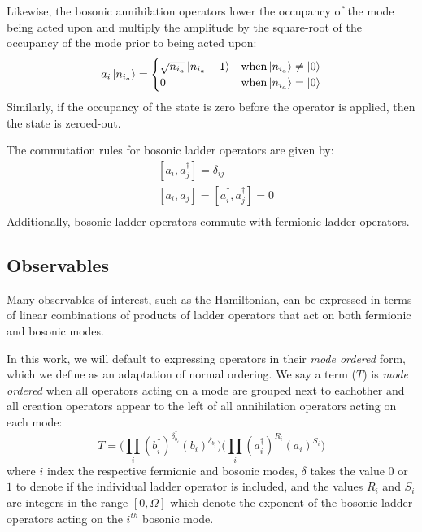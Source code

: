Likewise, the bosonic annihilation operators lower the occupancy of the mode being acted upon and multiply the amplitude by the square-root of the occupancy of the mode prior to being acted upon:
\begin{equation}
    \label{eq:bosonic-annihilation}
    a_i \ket{n_{i_a}} = 
    \begin{cases} 
        \sqrt{n_{i_a}} \ket{n_{i_a} - 1}  & {\rm when} \ket{n_{i_a}} \neq \ket{0} \\
        0 & {\rm when} \ket{n_{i_a}} = \ket{0}
    \end{cases}
\end{equation}
Similarly, if the occupancy of the state is zero before the operator is applied, then the state is zeroed-out.

The commutation rules for bosonic ladder operators are given by:
\begin{equation}
    \label{eq:bosonic-commutation}
    \begin{split}
        &[a_i, a_j^\dagger] = \delta_{ij}\\
        & [a_i, a_j] = [a_i^\dagger, a_j^\dagger] = 0 \\
    \end{split}
\end{equation}
Additionally, bosonic ladder operators commute with fermionic ladder operators.

\subsection{Observables}
\label{subsec:observables}

Many observables of interest, such as the Hamiltonian, can be expressed in terms of linear combinations of products of ladder operators that act on both fermionic and bosonic modes.

In this work, we will default to expressing operators in their \emph{mode ordered} form, which we define as an adaptation of normal ordering.
We say a term ($T$) is \textit{mode ordered} when all operators acting on a mode are grouped next to eachother and all creation operators appear to the left of all annihilation operators acting on each mode:
\begin{equation}
    T = \Big( \prod_i (b_i^\dagger)^{\delta_{b_i}^{\dagger}} (b_i)^{\delta_{b_i}} \Big) \Big( \prod_i (a_i^\dagger)^{R_i}(a_i)^{S_i} \Big) 
\end{equation}
where $i$ index the respective fermionic and bosonic modes, $\delta$ takes the value $0$ or $1$ to denote if the individual ladder operator is included, and the values $R_i$ and $S_i$ are integers in the range $[0, \Omega]$ which denote the exponent of the bosonic ladder operators acting on the $i^{th}$ bosonic mode.

